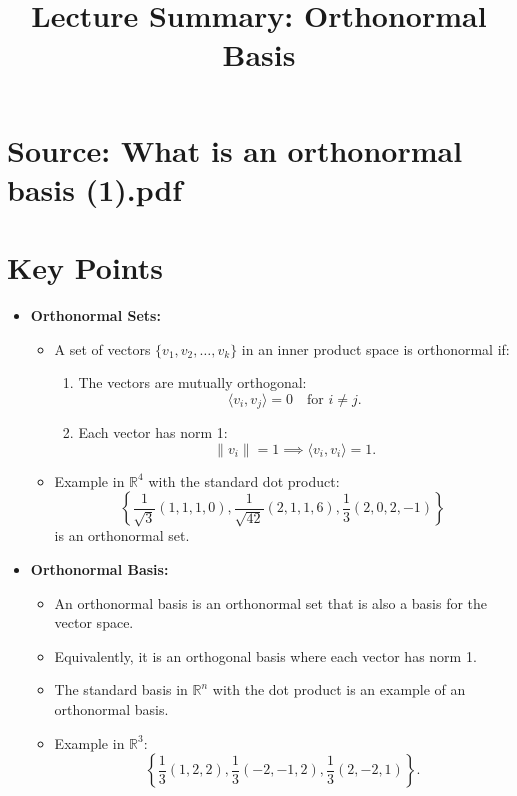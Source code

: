 \documentclass{article}
\title{Lecture Summary: Orthonormal Basis}
\author{}
\date{}
\begin{document}
\maketitle

\section*{Source: What is an orthonormal basis (1).pdf}

\section*{Key Points}

\begin{itemize}
  \item \textbf{Orthonormal Sets:}
    \begin{itemize}
      \item A set of vectors $\{v_1, v_2, \dots, v_k\}$ in an inner product space is orthonormal if:
        \begin{enumerate}
          \item The vectors are mutually orthogonal:
            \[
              \langle v_i, v_j \rangle = 0 \quad \text{for } i \neq j.
            \]
          \item Each vector has norm 1:
            \[
              \|v_i\| = 1 \implies \langle v_i, v_i \rangle = 1.
            \]
        \end{enumerate}
      \item Example in $\mathbb{R}^4$ with the standard dot product:
        \[
          \left\{\frac{1}{\sqrt{3}}(1, 1, 1, 0), \frac{1}{\sqrt{42}}(2, 1, 1, 6), \frac{1}{3}(2, 0, 2, -1)\right\}
        \]
        is an orthonormal set.
    \end{itemize}

  \item \textbf{Orthonormal Basis:}
    \begin{itemize}
      \item An orthonormal basis is an orthonormal set that is also a basis for the vector space.
      \item Equivalently, it is an orthogonal basis where each vector has norm 1.
      \item The standard basis in $\mathbb{R}^n$ with the dot product is an example of an orthonormal basis.
      \item Example in $\mathbb{R}^3$:
        \[
          \left\{\frac{1}{3}(1, 2, 2), \frac{1}{3}(-2, -1, 2), \frac{1}{3}(2, -2, 1)\right\}.
        \]
    \end{itemize}


\end{itemize}
\end{document}
